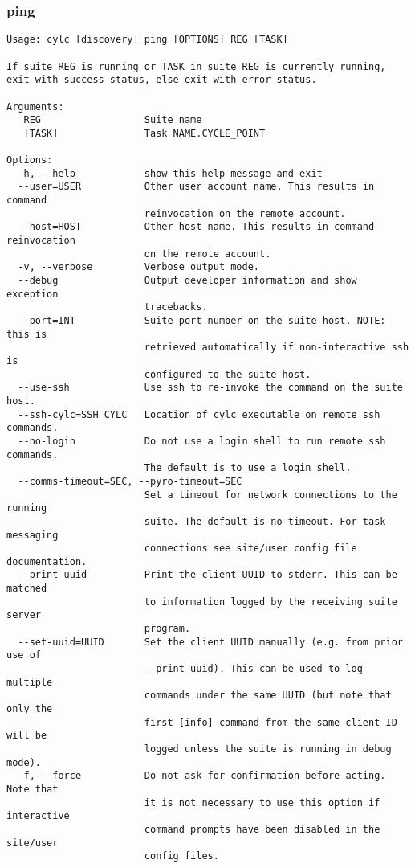 \subsubsection{ping}
\label{ping}
\begin{lstlisting}
Usage: cylc [discovery] ping [OPTIONS] REG [TASK] 

If suite REG is running or TASK in suite REG is currently running,
exit with success status, else exit with error status.

Arguments:
   REG                  Suite name
   [TASK]               Task NAME.CYCLE_POINT

Options:
  -h, --help            show this help message and exit
  --user=USER           Other user account name. This results in command
                        reinvocation on the remote account.
  --host=HOST           Other host name. This results in command reinvocation
                        on the remote account.
  -v, --verbose         Verbose output mode.
  --debug               Output developer information and show exception
                        tracebacks.
  --port=INT            Suite port number on the suite host. NOTE: this is
                        retrieved automatically if non-interactive ssh is
                        configured to the suite host.
  --use-ssh             Use ssh to re-invoke the command on the suite host.
  --ssh-cylc=SSH_CYLC   Location of cylc executable on remote ssh commands.
  --no-login            Do not use a login shell to run remote ssh commands.
                        The default is to use a login shell.
  --comms-timeout=SEC, --pyro-timeout=SEC
                        Set a timeout for network connections to the running
                        suite. The default is no timeout. For task messaging
                        connections see site/user config file documentation.
  --print-uuid          Print the client UUID to stderr. This can be matched
                        to information logged by the receiving suite server
                        program.
  --set-uuid=UUID       Set the client UUID manually (e.g. from prior use of
                        --print-uuid). This can be used to log multiple
                        commands under the same UUID (but note that only the
                        first [info] command from the same client ID will be
                        logged unless the suite is running in debug mode).
  -f, --force           Do not ask for confirmation before acting. Note that
                        it is not necessary to use this option if interactive
                        command prompts have been disabled in the site/user
                        config files.
\end{lstlisting}
